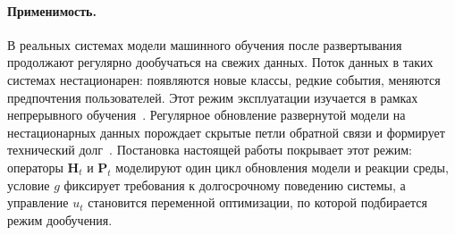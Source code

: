 \documentclass[a4paper,14pt,oneside,openany]{extarticle}
\newcommand{\bH}{\mathbf{H}}
\newcommand{\bP}{\mathbf{P}}
\begin{document}
\paragraph{Применимость.}
В реальных системах модели машинного обучения после развертывания продолжают регулярно дообучаться на свежих данных. Поток данных в таких системах нестационарен: появляются новые классы, редкие события, меняются предпочтения пользователей. Этот режим эксплуатации изучается в рамках непрерывного обучения~\cite{parisi2019continual, hadsell2020embracing}. Регулярное обновление развернутой модели на нестационарных данных порождает скрытые петли обратной связи и формирует технический долг~\cite{sculley2015hidden}. Постановка настоящей работы покрывает этот режим: операторы $\bH_t$ и $\bP_t$ моделируют один цикл обновления модели и реакции среды, условие $g$ фиксирует требования к долгосрочному поведению системы, а управление $u_t$ становится переменной оптимизации, по которой подбирается режим дообучения.
\end{document}
